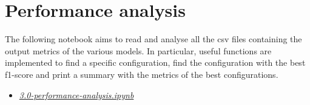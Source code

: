 \documentclass[../main]{subfiles}
\begin{document}
\section{Performance analysis}
The following notebook aims to read and analyse all the csv files containing the output metrics of the various models.
In particular, useful functions are implemented to find a specific configuration, find the configuration with the best f1-score and print a summary with the metrics of the best configurations.
\begin{itemize}
    \item \href{https://github.com/prushh/movie-lens-mlp/blob/main/notebooks/3.0-performance-analysis.ipynb}{\textit{3.0-performance-analysis.ipynb}}
\end{itemize}
\end{document}
